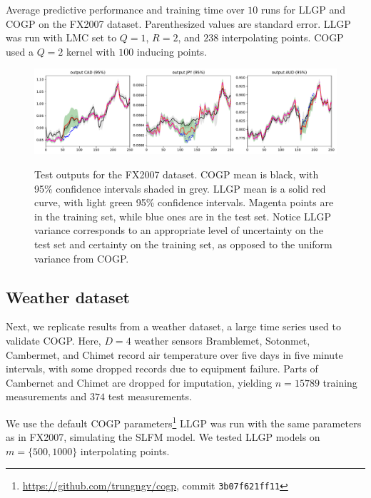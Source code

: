 \documentclass{article}
\begin{document}
\begin{table}[!h]
  \caption{Average predictive performance and training time over $10$ runs for LLGP and COGP on the FX2007 dataset. Parenthesized values are standard error. LLGP was run with LMC set to $Q=1$, $R=2$, and $238$ interpolating points. COGP used a $Q=2$ kernel with $100$ inducing points.}
\label{fx2007-tbl}
\begin{center}
  \begin{small}
    \begin{sc}
      
\end{sc}
\end{small}
\end{center}
\end{table}

\begin{figure}[!h]
\centering
{\includegraphics[width=\textwidth]{fx2007graph.pdf}}
\caption{Test outputs for the FX2007 dataset. COGP mean is black, with 95\% confidence intervals shaded in grey. LLGP mean is a solid red curve, with light green 95\% confidence intervals. Magenta points are in the training set, while blue ones are in the test set. Notice LLGP variance corresponds to an appropriate level of uncertainty on the test set and certainty on the training set, as opposed to the uniform variance from COGP.}
\label{fx2007-graph}
\end{figure}

\subsection{Weather dataset}\label{large-bench}

Next, we replicate results from a weather dataset, a large time series used to validate COGP. Here, $D=4$ weather sensors Bramblemet, Sotonmet, Cambermet, and Chimet record air temperature over five days in five minute intervals, with some dropped records due to equipment failure. Parts of Cambernet and Chimet are dropped for imputation, yielding $n=15789$ training measurements and $374$ test measurements. 

We use the default COGP parameters\footnote{\url{https://github.com/trungngv/cogp}, commit \texttt{3b07f621ff11}} LLGP was run with the same parameters as in FX2007, simulating the SLFM model. We tested LLGP models on $m=\{500, 1000\}$ interpolating points.
\end{document}
